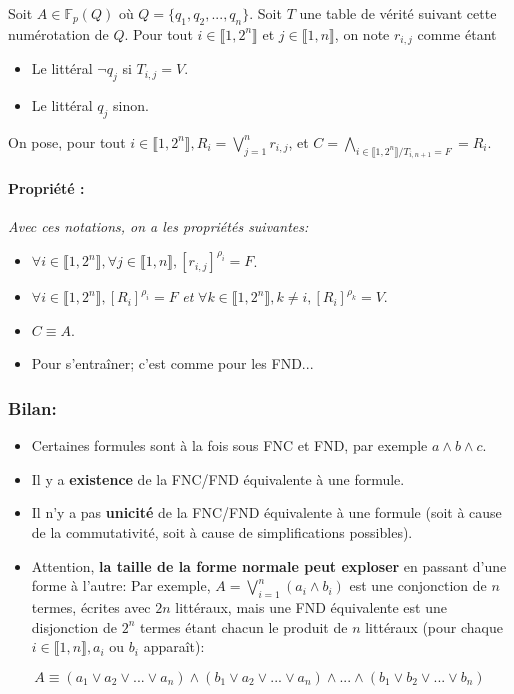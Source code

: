 \documentclass{scrartcl}
\newcommand{\prop}[1]{\paragraph{Propriété : } \textsl{#1}\\}
\newenvironment{demo}{\begin{itemize}[label=$\triangleright$]\item }{\end{itemize}}
\newcommand{\fpq}{\mathbb{F}_p(Q)}
\newcommand{\set}[1]{\{#1\}}
\newcommand{\intset}[1]{\llbracket #1 \rrbracket}
\newcommand{\definition}[1]{{\parindent0pt #1}}
\begin{document}
				Soit $A \in \fpq$ où $Q = \set{q_1,q_2,..., q_n}$. Soit $T$ une table de vérité suivant cette numérotation de $Q$.
				Pour tout $i \in \intset{1,2^n}$ et $j \in \intset{1,n}$, on note $r_{i,j}$ comme étant
				\vspace{5pt}
				\begin{itemize}
					\item Le littéral $\neg q_j$ si $T_{i,j} = V$.
					\item Le littéral $q_j$ sinon.
				\end{itemize}
				\vspace{5pt}
				\definition{On pose, pour tout $i \in \intset{1,2^n}, R_i = \bigvee_{j=1}^n r_{i,j}$, et $C = \bigwedge_{i\in\intset{1,2^n} / T_{i,n+1} = F} = R_i$.}

				\prop{Avec ces notations, on a les propriétés suivantes:}
				\begin{itemize}
					\item $\forall i \in \intset{1,2^n}, \forall j \in \intset{1,n}, [r_{i,j}]^{\rho_i} = F$.
					\item $\forall i \in \intset{1,2^n}, [R_i]^{\rho_i} = F$ \textsl{et} $\forall k \in \intset{1,2^n}, k \neq i, [R_i]^{\rho_k} = V$.
					\item $C \equiv A$.
				\end{itemize}
				\begin{demo}
					Pour s'entraîner; c'est comme pour les FND...
				\end{demo}

			\subsubsection{Bilan:}
				\begin{itemize}
					\item Certaines formules sont à la fois sous FNC et FND, par exemple $a \wedge b \wedge c$.
					\item Il y a \textbf{existence} de la FNC/FND équivalente à une formule.
					\item Il n'y a pas \textbf{unicité} de la FNC/FND équivalente à une formule (soit à cause de la commutativité, soit à cause de simplifications possibles).
					\item Attention, \textbf{la taille de la forme normale peut exploser} en passant d'une forme à l'autre:
						Par exemple, $A = \bigvee_{i=1}^n (a_i\wedge b_i)$ est une conjonction de $n$ termes, écrites avec $2n$ littéraux,
						mais une FND équivalente est une disjonction de $2^n$ termes étant chacun le produit de $n$ littéraux 
						(pour chaque $i\in \intset{1,n}, a_i$ ou $b_i$ apparaît):
				\end{itemize}
				\[
					A \equiv (a_1 \vee a_2 \vee ... \vee a_n) \wedge (b_1 \vee a_2 \vee ... \vee a_n) \wedge ... \wedge (b_1 \vee b_2 \vee ... \vee b_n)
				\]
\end{document}
